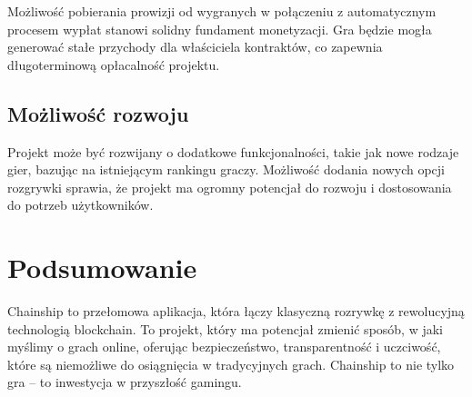 \documentclass{article}
\begin{document}
Możliwość pobierania prowizji od wygranych w połączeniu z automatycznym procesem wypłat stanowi solidny fundament monetyzacji. Gra będzie mogła generować stałe przychody dla właściciela kontraktów, co zapewnia długoterminową opłacalność projektu.

\subsection{Możliwość rozwoju}

Projekt może być rozwijany o dodatkowe funkcjonalności, takie jak nowe rodzaje gier, bazując na istniejącym rankingu graczy. Możliwość dodania nowych opcji rozgrywki sprawia, że projekt ma ogromny potencjał do rozwoju i dostosowania do potrzeb użytkowników.

\section{Podsumowanie}

Chainship to przełomowa aplikacja, która łączy klasyczną rozrywkę z rewolucyjną technologią blockchain. To projekt, który ma potencjał zmienić sposób, w jaki myślimy o grach online, oferując bezpieczeństwo, transparentność i uczciwość, które są niemożliwe do osiągnięcia w tradycyjnych grach. Chainship to nie tylko gra – to inwestycja w przyszłość gamingu.
\end{document}
